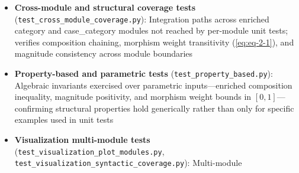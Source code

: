 \documentclass[
]{article}
\providecommand{\tightlist}{%
  \setlength{\itemsep}{0pt}\setlength{\parskip}{0pt}}
\begin{document}
\begin{itemize}
  \begin{itemize}
  \tightlist
  \item
    \texttt{test\_daif\_core.py}: Distributional Bellman operator,
    push-forward return, C51 categorical projection
  \item
    \texttt{test\_daif\_quantile.py}: QR-DQN quantile Huber loss, IQN
    risk distortion (neutral/optimistic/pessimistic/CVaR), Wasserstein
    distances \(W_1\)/\(W_2\)
  \item
    \texttt{test\_daif\_inference.py}:
    \texttt{distributional\_case\_assignment()} posterior convergence,
    variational message passing, Bethe free energy, expected information
    gain
  \item
    \texttt{test\_daif\_prediction.py}: DPE precision-weighting,
    N400/P600 amplitude from return distributions, full
    \texttt{ERPProfile} waveform generation and peak latency
  \item
    \texttt{test\_daif\_policy.py}: \texttt{G\_policy()} EFE + risk
    term, Boltzmann policy temperature scaling, distributional epistemic
    value
  \item
    \texttt{test\_daif\_metrics.py}: Convergence diagnostics
    (monotonicity, relative reduction), distributional KL divergence,
    quantile calibration error, return entropy
  \item
    \texttt{test\_daif\_types.py}: \texttt{DistributionalReturn}
    helpers, \texttt{DAIFResult} / \texttt{ERPProfile} properties (with
    integration coverage of re-exported DAIF entrypoints)
  \end{itemize}
\item
  \textbf{Cross-module and structural coverage tests}
  (\texttt{test\_cross\_module\_coverage.py}): Integration paths across
  enriched category and case\_category modules not reached by per-module
  unit tests; verifies composition chaining, morphism weight
  transitivity (\autoref{eq:eq-2-1}), and magnitude consistency across
  module boundaries
\item
  \textbf{Property-based and parametric tests}
  (\texttt{test\_property\_based.py}): Algebraic invariants exercised
  over parametric inputs---enriched composition inequality, magnitude
  positivity, and morphism weight bounds in \([0,1]\)---confirming
  structural properties hold generically rather than only for specific
  examples used in unit tests
\item
  \textbf{Visualization multi-module tests}
  (\texttt{test\_visualization\_plot\_modules.py},
  \texttt{test\_visualization\_syntactic\_coverage.py}): Multi-module

\end{itemize}
\end{document}
